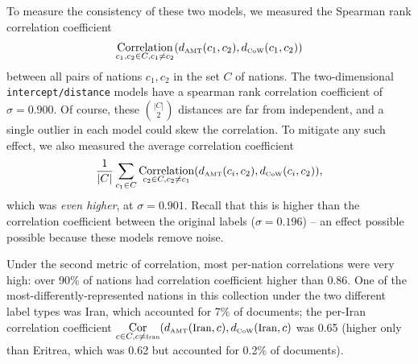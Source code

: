 To measure the consistency of these two models, we measured the
Spearman rank correlation coefficient 
\begin{align*}
\underset{c_1, c_2 \in C, c_1   \neq c_2}
{\operatorname{\mbox{Correlation}}}(d_{\mbox{\tiny AMT}}(c_1, c_2), d_{\mbox{\tiny CoW}}(c_1, c_2))
\end{align*}
between all pairs of nations $c_1, c_2$ in the set $C$ of
nations. The two-dimensional \verb!intercept/distance! models have
a spearman rank correlation coefficient of $\sigma=0.900$.  Of course,
these $|C| \choose{2}$ distances are far from independent, and a
single outlier in each model could skew the correlation.  To mitigate
any such effect, we also measured the average correlation coefficient
\begin{align*}
  \frac{1}{|C|} \sum_{c_1 \in C}
  \underset{c_2 \in C, c_2 \neq c_1}
  {\operatorname{\mbox{Correlation}}}(d_{\mbox{\tiny AMT}}(c_i, c_2), d_{\mbox{\tiny
        CoW}}(c_i, c_2) ),
\end{align*}
which was \emph{even higher}, at $\sigma=0.901$. Recall that this is
higher than the correlation coefficient between the original labels
($\sigma=0.196$) -- an effect possible possible because these models
remove noise.

Under the second metric of correlation, most per-nation correlations
were very high: over 90\% of nations had correlation coefficient
higher than 0.86.  One of the most-differently-represented nations
in this collection under the two different label types was Iran, which
accounted for 7\% of documents; the per-Iran correlation coefficient
$\underset{c \in C, c \neq \mbox{\tiny Iran}}{\operatorname{\mbox{Cor}}}(d_{\mbox{\tiny AMT}}(\mbox{\small Iran}, c),
d_{\mbox{\tiny CoW}}(\mbox{\small Iran}, c)$ was 0.65 (higher only
than Eritrea, which was 0.62 but accounted for 0.2\% of documents).

